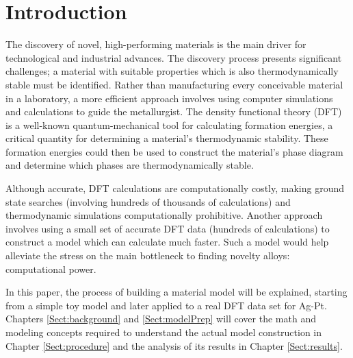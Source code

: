 \chapter{Introduction}\label{Sect:intro}
\par The discovery of novel, high-performing materials is the main driver for technological and industrial advances. The discovery process presents significant challenges; a material with suitable properties which is also thermodynamically stable must be identified. Rather than manufacturing every conceivable material in a laboratory, a more efficient approach involves using computer simulations and calculations to guide the metallurgist.  The density functional theory (DFT) is a well-known quantum-mechanical tool for calculating formation energies, a critical quantity for determining a material's thermodynamic stability.  These formation energies could then be used to construct the material's phase diagram and determine which phases are thermodynamically stable. 
\par Although accurate, DFT calculations are computationally costly, making ground state searches (involving hundreds of thousands of calculations) and thermodynamic simulations computationally prohibitive. Another approach involves using a small set of accurate DFT data (hundreds of calculations) to construct a model which can calculate much faster.  Such a model would help alleviate the stress on the main bottleneck to finding novelty alloys: computational power. 
\par In this paper, the process of building a material model will be explained, starting from a simple toy model and later applied to a real DFT data set for Ag-Pt. Chapters \ref{Sect:background} and \ref{Sect:modelPrep} will cover the math and modeling concepts required to understand the actual model construction in Chapter \ref{Sect:procedure} and the analysis of its results in Chapter \ref{Sect:results}. 